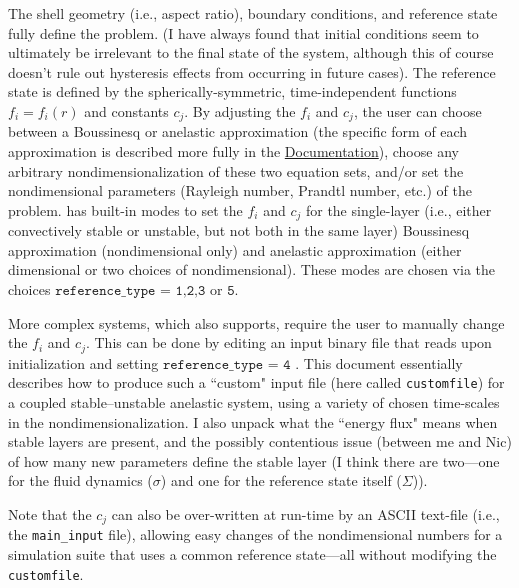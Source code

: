 \documentclass[12pt]{article}
\numberwithin{equation}{section}
\begin{document}
The shell geometry (i.e., aspect ratio), boundary conditions, and reference state fully define the problem. (I have always found that initial conditions seem to ultimately be irrelevant to the final state of the system, although this of course doesn't rule out hysteresis effects from occurring in future cases). The reference state is defined by the spherically-symmetric, time-independent functions $f_i=f_i(r)$ and constants $c_j$. By adjusting the $f_i$ and $c_j$, the user can choose between a Boussinesq or anelastic approximation (the specific form of each approximation is described more fully in the  \href{https://rayleigh-documentation.readthedocs.io/en/latest/doc/source/User_Guide/physics_math_overview.html#the-system-of-equations-solved-in-rayleigh}{Documentation}), choose any arbitrary nondimensionalization of these two equation sets, and/or set the nondimensional parameters (Rayleigh number, Prandtl number, etc.) of the problem.  {\rayleigh} has built-in modes to set the $f_i$ and $c_j$ for the single-layer (i.e., either convectively stable or unstable, but not both in the same layer) Boussinesq approximation (nondimensional only) and anelastic approximation (either dimensional or two choices of nondimensional). These modes are chosen via the choices $\texttt{reference\_type = 1,2,3}$ or $\texttt{5}$. 

More complex systems, which {\rayleigh} also supports, require the user to manually change the $f_i$ and $c_j$. This can be done by editing an input binary file that {\rayleigh} reads upon initialization and setting $\texttt{reference\_type = 4}$ . This document essentially describes how to produce such a ``custom" input file (here called {\texttt{customfile}}) for a coupled stable--unstable anelastic system, using a variety of chosen time-scales in the nondimensionalization. I also unpack what the ``energy flux" means when stable layers are present, and the possibly contentious issue (between me and Nic) of how many new parameters define the stable layer (I think there are two---one for the fluid dynamics ($\sigma$) and one for the reference state itself ($\Sigma$)). 

Note that the $c_j$ can also be over-written at run-time by an ASCII text-file (i.e., the \texttt{main\_input} file), allowing easy changes of the nondimensional numbers for a simulation suite that uses a common reference state---all without modifying the  {\texttt{customfile}}.
	
\end{document}
